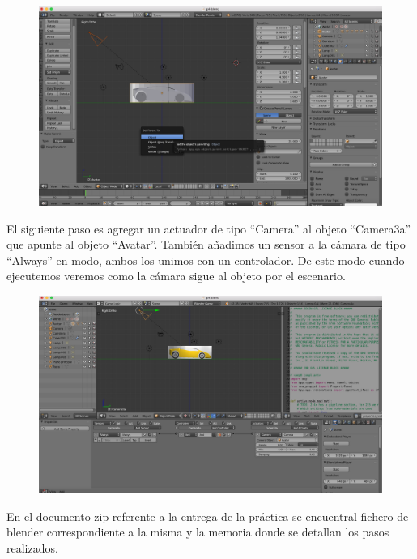 \documentclass[10pt]{article}
\begin{document}
\begin{figure}[H]
	\begin{center}
	 		\includegraphics[width = 1.00\textwidth]{Imagenes/p4-img21}
	\end{center} 
\end{figure}

El siguiente paso es agregar un actuador de tipo ``Camera'' al objeto ``Camera3a'' que apunte al objeto ``Avatar''. También añadimos un sensor a la cámara de tipo ``Always'' en modo,  ambos los unimos con un controlador. De este modo cuando ejecutemos veremos como la cámara sigue al objeto por el escenario. \\

\begin{figure}[H]
	\begin{center}
	 		\includegraphics[width = 1.00\textwidth]{Imagenes/p4-img22}
	\end{center} 
\end{figure}

En el documento zip referente a la entrega de la práctica se encuentral fichero de blender correspondiente a la misma y la memoria donde se detallan los pasos realizados.
\end{document}
